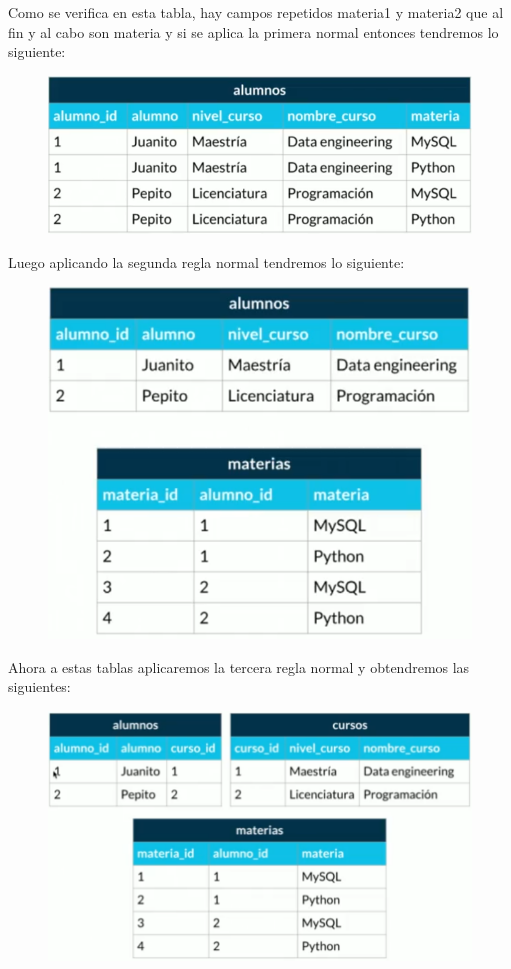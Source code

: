 \documentclass{article}
\begin{document}
Como se verifica en esta tabla, hay campos repetidos materia1 y materia2 que al
fin y al cabo son materia y si se aplica la primera normal entonces tendremos
lo siguiente:

\begin{figure}[h!]
    \centering
      \includegraphics[scale=0.45]{./Pictures/023_primera_normal.png}
\end{figure}

Luego aplicando la segunda regla normal tendremos lo siguiente:
\begin{figure}[h!]
    \centering
      \includegraphics[scale=0.5]{./Pictures/024_segunda_normal.png}
\end{figure}

Ahora a estas tablas aplicaremos la tercera regla normal y obtendremos las siguientes:

\begin{figure}[h!]
    \centering
      \includegraphics[scale=0.45]{./Pictures/025_tercera_normal.png}
\end{figure}
\end{document}

